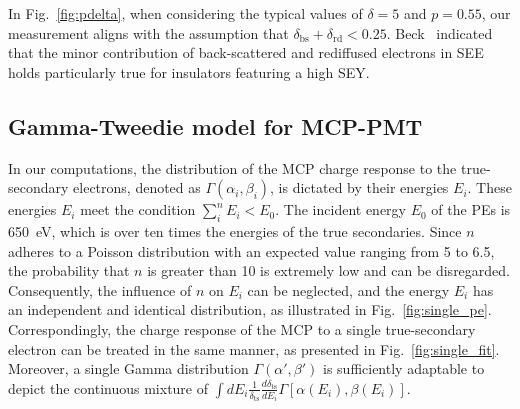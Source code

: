 In Fig.~\ref{fig:pdelta}, when considering the typical values of \(\delta = 5\) and \(p = 0.55\), our measurement aligns with the assumption that \(\delta_\text{bs}+\delta_\text{rd}<0.25\). Beck~\cite{beck_physical_1966} indicated that the minor contribution of back-scattered and rediffused electrons in SEE holds particularly true for insulators featuring a high SEY.


\subsection{Gamma-Tweedie model for MCP-PMT}\label{sec:model}
In our computations, the distribution of the MCP charge response to the true-secondary electrons, denoted as $\varGamma(\alpha_{i},\beta_{i})$, is dictated by their energies $E_{i}$. These energies $E_{i}$ meet the condition $\sum_{i}^{n}E_{i}<E_0$. The incident energy \(E_0\) of the PEs is \SI{650}{eV}, which is over ten times the energies of the true secondaries. Since $n$ adheres to a Poisson distribution with an expected value ranging from 5 to 6.5, the probability that $n$ is greater than 10 is extremely low and can be disregarded. Consequently, the influence of $n$ on $E_{i}$ can be neglected, and the energy \(E_{i}\) has an independent and identical distribution, as illustrated in Fig.~\ref{fig:single_pe}. Correspondingly, the charge response of the MCP to a single true-secondary electron can be treated in the same manner, as presented in Fig.~\ref{fig:single_fit}. Moreover, a single Gamma distribution \(\varGamma(\alpha',\beta')\) is sufficiently adaptable to depict the continuous mixture of \(\int dE_{i}\frac{1} {\delta_{\mathrm{ts}}}\frac{d\delta_{\mathrm{ts}}} {dE_{i}}\varGamma[\alpha(E_{i}),\beta(E_{i})]\).

